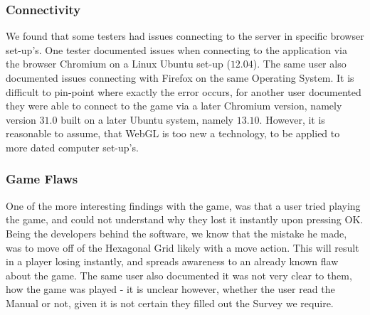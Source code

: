 \subsubsection{Connectivity}

We found that some testers had issues connecting to the server in specific browser set-up's. One tester documented issues when connecting to the application via the browser Chromium on a Linux Ubuntu set-up ($12.04$). The same user also documented issues connecting with Firefox on the same Operating System. It is difficult to pin-point where exactly the error occurs, for another user documented they were able to connect to the game via a later Chromium version, namely version $31.0$ built on a later Ubuntu system, namely $13.10$. However, it is reasonable to assume, that WebGL is too new a technology, to be applied to more dated computer set-up's.

\subsubsection{Game Flaws}

One of the more interesting findings with the game, was that a user tried playing the game, and could not understand why they lost it instantly upon pressing OK. Being the developers behind the software, we know that the mistake he made, was to move off of the Hexagonal Grid likely with a move action. This will result in a player losing instantly, and spreads awareness to an already known flaw about the game. The same user also documented it was not very clear to them, how the game was played - it is unclear however, whether the user read the Manual or not, given it is not certain they filled out the Survey we require.